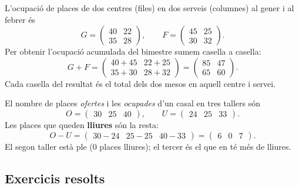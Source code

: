 \begin{exemple}
L'ocupació de places de dos centres (files) en dos serveis (columnes) al gener i
al febrer és
\[
G=\begin{pmatrix} 40 & 22 \\ 35 & 28 \end{pmatrix},\qquad
F=\begin{pmatrix} 45 & 25 \\ 30 & 32 \end{pmatrix}.
\]
Per obtenir l'ocupació acumulada del bimestre sumem casella a casella:
\[
G+F=\begin{pmatrix} 40+45 & 22+25 \\ 35+30 & 28+32 \end{pmatrix}
    =\begin{pmatrix} 85 & 47 \\ 65 & 60 \end{pmatrix}.
\]
Cada casella del resultat és el total dels dos mesos en aquell centre i servei.
\end{exemple}

\begin{exemple}
El nombre de places \emph{ofertes} i les \emph{ocupades} d'un casal en tres
tallers són
\[
O=\begin{pmatrix} 30 & 25 & 40 \end{pmatrix},\qquad
U=\begin{pmatrix} 24 & 25 & 33 \end{pmatrix}.
\]
Les places que queden \textbf{lliures} són la resta:
\[
O-U=\begin{pmatrix} 30-24 & 25-25 & 40-33 \end{pmatrix}
    =\begin{pmatrix} 6 & 0 & 7 \end{pmatrix}.
\]
El segon taller està ple ($0$ places lliures); el tercer és el que en té més de
lliures.
\end{exemple}

\subsection{Exercicis resolts}

